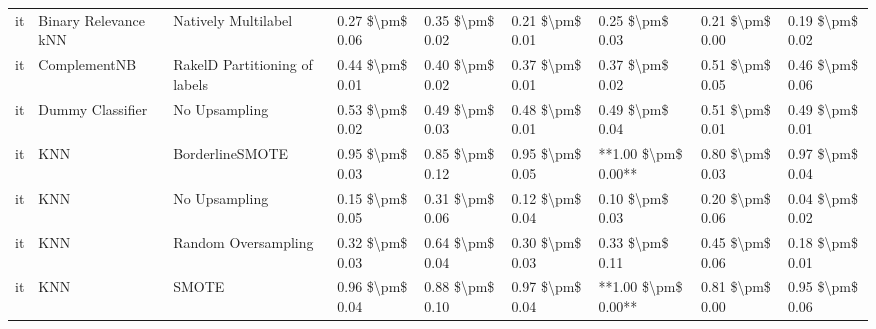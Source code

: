 \begin{tabular}{lllllllll}
      it &            Binary Relevance kNN &           Natively Multilabel &     0.27 \$\textbackslash pm\$ 0.06 &           0.35 \$\textbackslash pm\$ 0.02 &       0.21 \$\textbackslash pm\$ 0.01 &        0.25 \$\textbackslash pm\$ 0.03 &                         0.21 \$\textbackslash pm\$ 0.00 &     0.19 \$\textbackslash pm\$ 0.02 \\
      it &                    ComplementNB & RakelD Partitioning of labels &     0.44 \$\textbackslash pm\$ 0.01 &           0.40 \$\textbackslash pm\$ 0.02 &       0.37 \$\textbackslash pm\$ 0.01 &        0.37 \$\textbackslash pm\$ 0.02 &                         0.51 \$\textbackslash pm\$ 0.05 &     0.46 \$\textbackslash pm\$ 0.06 \\
      it &                Dummy Classifier &                 No Upsampling &     0.53 \$\textbackslash pm\$ 0.02 &           0.49 \$\textbackslash pm\$ 0.03 &       0.48 \$\textbackslash pm\$ 0.01 &        0.49 \$\textbackslash pm\$ 0.04 &                         0.51 \$\textbackslash pm\$ 0.01 &     0.49 \$\textbackslash pm\$ 0.01 \\
      it &                             KNN &               BorderlineSMOTE &     0.95 \$\textbackslash pm\$ 0.03 &           0.85 \$\textbackslash pm\$ 0.12 &       0.95 \$\textbackslash pm\$ 0.05 &    **1.00 \$\textbackslash pm\$ 0.00** &                         0.80 \$\textbackslash pm\$ 0.03 &     0.97 \$\textbackslash pm\$ 0.04 \\
      it &                             KNN &                 No Upsampling &     0.15 \$\textbackslash pm\$ 0.05 &           0.31 \$\textbackslash pm\$ 0.06 &       0.12 \$\textbackslash pm\$ 0.04 &        0.10 \$\textbackslash pm\$ 0.03 &                         0.20 \$\textbackslash pm\$ 0.06 &     0.04 \$\textbackslash pm\$ 0.02 \\
      it &                             KNN &           Random Oversampling &     0.32 \$\textbackslash pm\$ 0.03 &           0.64 \$\textbackslash pm\$ 0.04 &       0.30 \$\textbackslash pm\$ 0.03 &        0.33 \$\textbackslash pm\$ 0.11 &                         0.45 \$\textbackslash pm\$ 0.06 &     0.18 \$\textbackslash pm\$ 0.01 \\
      it &                             KNN &                         SMOTE &     0.96 \$\textbackslash pm\$ 0.04 &           0.88 \$\textbackslash pm\$ 0.10 &       0.97 \$\textbackslash pm\$ 0.04 &    **1.00 \$\textbackslash pm\$ 0.00** &                         0.81 \$\textbackslash pm\$ 0.00 &     0.95 \$\textbackslash pm\$ 0.06 \\

\end{tabular}
